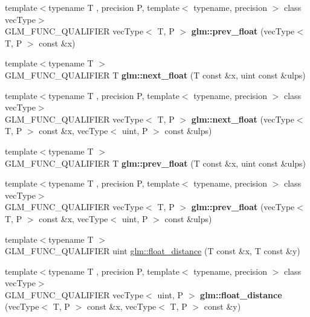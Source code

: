 \begin{DoxyCompactItemize}
{\footnotesize template$<$typename T , precision P, template$<$ typename, precision $>$ class vec\+Type$>$ }\\G\+L\+M\+\_\+\+F\+U\+N\+C\+\_\+\+Q\+U\+A\+L\+I\+F\+I\+ER vec\+Type$<$ T, P $>$ {\bfseries glm\+::prev\+\_\+float} (vec\+Type$<$ T, P $>$ const \&x)
\item 
\mbox{\label{ulp_8inl_ae4ffae05b7502be722f522c04f7e42ac}} 
{\footnotesize template$<$typename T $>$ }\\G\+L\+M\+\_\+\+F\+U\+N\+C\+\_\+\+Q\+U\+A\+L\+I\+F\+I\+ER T {\bfseries glm\+::next\+\_\+float} (T const \&x, uint const \&ulps)
\item 
\mbox{\label{ulp_8inl_a3ad10c60be0fa0e754c8064ca13c4b91}} 
{\footnotesize template$<$typename T , precision P, template$<$ typename, precision $>$ class vec\+Type$>$ }\\G\+L\+M\+\_\+\+F\+U\+N\+C\+\_\+\+Q\+U\+A\+L\+I\+F\+I\+ER vec\+Type$<$ T, P $>$ {\bfseries glm\+::next\+\_\+float} (vec\+Type$<$ T, P $>$ const \&x, vec\+Type$<$ uint, P $>$ const \&ulps)
\item 
\mbox{\label{ulp_8inl_a87ac8f75510274e112fe8512cfaa6935}} 
{\footnotesize template$<$typename T $>$ }\\G\+L\+M\+\_\+\+F\+U\+N\+C\+\_\+\+Q\+U\+A\+L\+I\+F\+I\+ER T {\bfseries glm\+::prev\+\_\+float} (T const \&x, uint const \&ulps)
\item 
\mbox{\label{ulp_8inl_a742d4d85c23906178d1fd0c9fbab266c}} 
{\footnotesize template$<$typename T , precision P, template$<$ typename, precision $>$ class vec\+Type$>$ }\\G\+L\+M\+\_\+\+F\+U\+N\+C\+\_\+\+Q\+U\+A\+L\+I\+F\+I\+ER vec\+Type$<$ T, P $>$ {\bfseries glm\+::prev\+\_\+float} (vec\+Type$<$ T, P $>$ const \&x, vec\+Type$<$ uint, P $>$ const \&ulps)
\item 
{\footnotesize template$<$typename T $>$ }\\G\+L\+M\+\_\+\+F\+U\+N\+C\+\_\+\+Q\+U\+A\+L\+I\+F\+I\+ER uint \hyperlink{group__gtc__ulp_ga2e09bd6c8b0a9c91f6f5683d68245634}{glm\+::float\+\_\+distance} (T const \&x, T const \&y)
\item 
\mbox{\label{ulp_8inl_a2e00104097b2f3967e97131933595309}} 
{\footnotesize template$<$typename T , precision P, template$<$ typename, precision $>$ class vec\+Type$>$ }\\G\+L\+M\+\_\+\+F\+U\+N\+C\+\_\+\+Q\+U\+A\+L\+I\+F\+I\+ER vec\+Type$<$ uint, P $>$ {\bfseries glm\+::float\+\_\+distance} (vec\+Type$<$ T, P $>$ const \&x, vec\+Type$<$ T, P $>$ const \&y)
\end{DoxyCompactItemize}


